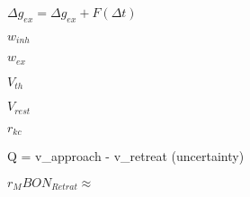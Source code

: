$\Delta g_{ex} = \Delta g_{ex} + F(\Delta t)$

$w_{inh}$

$w_{ex}$

$V_{th}$

$V_{rest}$

$r_{kc}$

Q = v_{approach} - v_{retreat} (uncertainty)


$r_MBON_{Retrat} \approx $